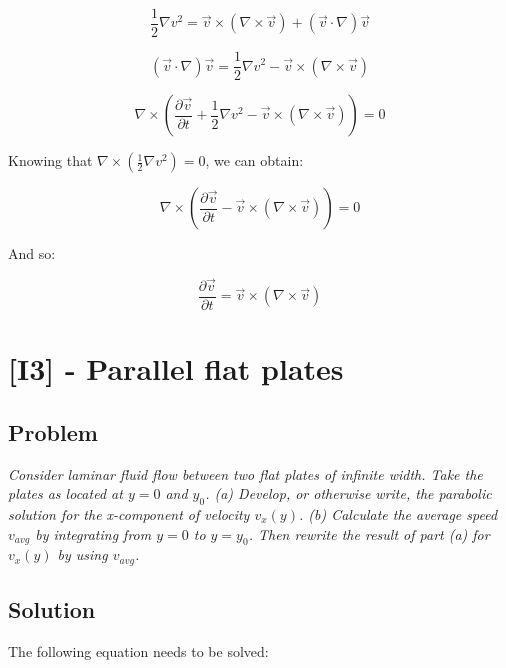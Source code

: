 \begin{equation}\label{eq830}
\frac{1}{2}\nabla v^2 = \vec{v} \times (\nabla \times \vec{v}) + (\vec{v} \cdot \nabla)\vec{v}
\end{equation}

\begin{equation}\label{eq831}
(\vec{v} \cdot \nabla)\vec{v} = \frac{1}{2}\nabla v^2 - \vec{v} \times (\nabla \times \vec{v})
\end{equation}


\begin{equation}\label{eq832}
\nabla \times \left( \frac{\partial \vec{v}}{\partial t} + \frac{1}{2}\nabla v^2 - \vec{v} \times (\nabla \times \vec{v}) \right) = 0
\end{equation}

Knowing that $\nabla \times \left( \frac{1}{2}\nabla v^2 \right) = 0$, we can obtain:


\begin{equation}\label{eq833}
\nabla \times \left( \frac{\partial \vec{v}}{\partial t} - \vec{v} \times (\nabla \times \vec{v}) \right) = 0
\end{equation}

And so:

\begin{equation}\label{eq833}
\frac{\partial \vec{v}}{\partial t} = \vec{v} \times (\nabla \times \vec{v})
\end{equation}


\section{[I3] - Parallel flat plates}
\label{prob84}

\subsection{Problem}
\textit{Consider laminar fluid flow between two flat plates of infinite width. Take the plates as located at $y= 0$ and $y_0$. (a) Develop, or otherwise write, the parabolic solution for the x-component of velocity $v_x(y)$. (b) Calculate the average speed $v_{avg}$ by integrating from $y= 0$ to $y=y_0$. Then rewrite the result of part (a) for $v_x(y)$ by using $v_{avg}$.}

\subsection{Solution}

The following equation needs to be solved:

